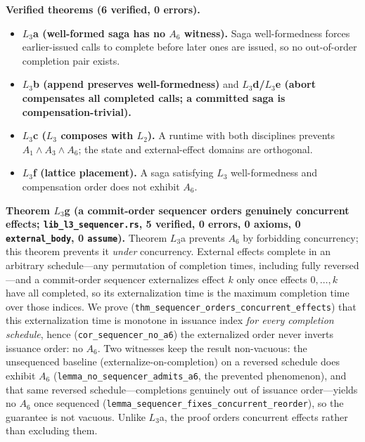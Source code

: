 \documentclass[journal,compsoc,10pt]{IEEEtran}
\theoremstyle{definition}
\theoremstyle{remark}
\begin{document}
\medskip
\noindent\textbf{Verified theorems (6 verified, 0 errors).}
\begin{itemize}
  \item \textbf{$L_3$a (well-formed saga has no $A_6$ witness).} Saga
    well-formedness forces earlier-issued calls to complete before later
    ones are issued, so no out-of-order completion pair exists.
  \item \textbf{$L_3$b (append preserves well-formedness)} and
    \textbf{$L_3$d/$L_3$e (abort compensates all completed calls; a
    committed saga is compensation-trivial).}
  \item \textbf{$L_3$c ($L_3$ composes with $L_2$).} A runtime with both
    disciplines prevents $A_1\wedge A_3\wedge A_6$; the state and
    external-effect domains are orthogonal.
  \item \textbf{$L_3$f (lattice placement).} A saga satisfying $L_3$
    well-formedness and compensation order does not exhibit $A_6$.
\end{itemize}

\medskip
\noindent\textbf{Theorem $L_3$g (a commit-order sequencer orders genuinely
concurrent effects; \texttt{lib\_l3\_sequencer.rs}, 5 verified, 0 errors, 0
axioms, 0 \texttt{external\_body}, 0 \texttt{assume}).}
Theorem $L_3$a prevents $A_6$ by forbidding concurrency; this theorem prevents
it \emph{under} concurrency. External effects complete in an arbitrary
schedule---any permutation of completion times, including fully reversed---and
a commit-order sequencer externalizes effect $k$ only once effects $0,\dots,k$
have all completed, so its externalization time is the maximum completion time
over those indices. We prove
(\texttt{thm\_sequencer\_orders\_concurrent\_effects}) that this
externalization time is monotone in issuance index \emph{for every completion
schedule}, hence (\texttt{cor\_sequencer\_no\_a6}) the externalized order never
inverts issuance order: no $A_6$. Two witnesses keep the result non-vacuous: the
unsequenced baseline (externalize-on-completion) on a reversed schedule does
exhibit $A_6$ (\texttt{lemma\_no\_sequencer\_admits\_a6}, the prevented
phenomenon), and that same reversed schedule---completions genuinely out of
issuance order---yields no $A_6$ once sequenced
(\texttt{lemma\_sequencer\_fixes\_concurrent\_reorder}), so the guarantee is
not vacuous. Unlike $L_3$a, the proof orders concurrent effects rather than
excluding them.
\end{document}
